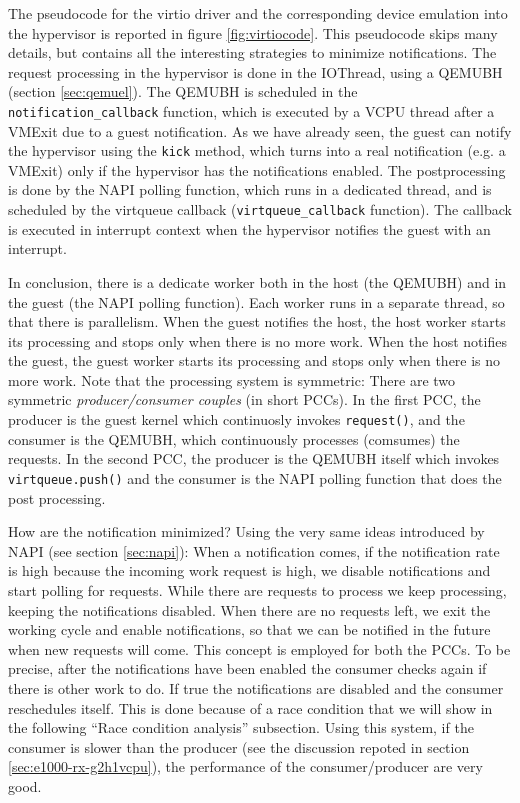 The pseudocode for the virtio driver and the corresponding device emulation into the hypervisor is reported in figure
\ref{fig:virtiocode}. This pseudocode skips many details, but contains all the interesting strategies to minimize notifications.
The request processing in the hypervisor is done in the IOThread, using a QEMUBH (section \ref{sec:qemuel}). The QEMUBH is scheduled
in the \texttt{notification\_callback} function, which is executed by a VCPU thread after a VMExit due to a guest notification.
As we have already seen, the guest can notify the hypervisor using the \texttt{kick} method, which turns into a real notification
(e.g. a VMExit) only if the hypervisor has the notifications enabled.
The postprocessing is done by the NAPI polling function, which runs in a dedicated thread, and is scheduled by the virtqueue callback
(\texttt{virtqueue\_callback} function). The callback is executed in interrupt context when the hypervisor notifies the guest with
an interrupt.

\vspace{0.5cm}

In conclusion, there is a dedicate worker both in the host (the QEMUBH) and in the guest (the NAPI polling function). Each worker runs
in a separate thread, so that there is parallelism. When the guest notifies the host, the host worker starts its processing and stops
only when there is no more work. When the host notifies the guest, the guest worker starts its processing and stops only when there is
no more work. Note that the processing system is symmetric: There are two symmetric \emph{producer/consumer couples} (in short PCCs). In 
the first PCC, the producer is the guest kernel which continuosly invokes \texttt{request()}, and the consumer is the QEMUBH, which 
continuously processes (comsumes) the requests. In the second PCC, the producer is the QEMUBH itself which invokes 
\texttt{virtqueue.push()} and the consumer is the NAPI polling function that does the post processing.

\vspace{0.5cm}

How are the notification minimized? Using the very same ideas introduced by NAPI (see section \ref{sec:napi}): When a notification comes,
if the notification rate is high because the incoming work request is high, we disable notifications and start polling for
requests. While there are requests to process we keep processing, keeping the notifications disabled. When there are no requests left, we
exit the working cycle and enable notifications, so that we can be notified in the future when new requests will come.
This concept is employed for both the PCCs. To be precise, after the notifications have been enabled the consumer 
checks again if there is other work to do. If true the notifications are disabled and the consumer reschedules itself. This is done because
of a race condition that we will show in the following ``Race condition analysis'' subsection.
Using this system, if the consumer is slower than the producer (see the discussion repoted in section \ref{sec:e1000-rx-g2h1vcpu}), the 
performance of the consumer/producer are very good.

